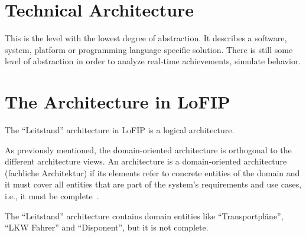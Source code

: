 \documentclass{llncs} %
\begin{document}
\section{Technical Architecture}


This is the level with the lowest degree of abstraction. 
It describes a software, system, platform or programming language specific solution.
There is still some level of abstraction in order to analyze real-time achievements,
simulate behavior.

\section{The Architecture in LoFIP}
\label{sec:lofip}

The ``Leitstand'' architecture in LoFIP is a logical architecture.

As previously mentioned, the domain-oriented architecture  is orthogonal to the different
architecture views.
An architecture is a domain-oriented architecture (fachliche Architektur)
if its elements refer to concrete entities of the domain and
it must cover all entities that are part of the system's requirements and use cases,
i.e., it must be complete~\cite{Posch2004BS}.


The ``Leitstand'' architecture contains domain entities like ``Transportpl{\"a}ne'',
``LKW Fahrer'' and ``Disponent'', but it is not complete. 



\end{document}
